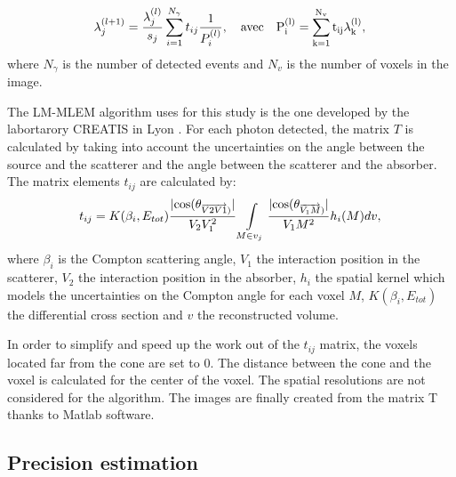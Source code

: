 \documentclass[11pt]{iopart}
\begin{document}
\begin{equation}
\lambda_j^{(l+1)} =  \frac{\lambda_j^{(l)} }{s_j} \sum\limits_{i=1}^{N_{\gamma}} t_{ij} \frac{1}{P_i^{(l)}},\quad \rm{avec}\quad  P_i^{(l)}=\sum\limits_{k=1}^{N_{v}} t_{ij}\lambda_k^{(l)},
 \label{eq:equation_lambda_compton_med_nucleaire}\newline
\end{equation}
where $N_{\gamma}$ is the number of detected events and $N_v$ is the number of voxels in the image.\newline

The LM-MLEM algorithm uses for this study is the one developed by the labortarory CREATIS in Lyon \cite{maxim_analytical_2009,lojacono_low_2013,maxim_filtered_2014,hilaire_compton_2014}.\newline
For each photon detected, the matrix $T$ is calculated by taking into account the uncertainties on the angle between the source and the scatterer and the angle between the scatterer and the absorber.
The matrix elements  $t_{ij}$  are calculated by:
\begin{equation}
 t_{ij} = K(\beta_i,E_{tot})\frac{|\rm{cos}(\theta_{\overrightarrow{V2V1})} |}{V_2V_1^2} \int\limits_{M\in v_j} \frac{|\rm{cos}(\theta_{\overrightarrow{V_1M})}| }{V_1M^2} h_i(M)dv,
 \label{eq:equation_tij_compton_med_nucleaire}\newline
\end{equation}
where $\beta_i$ is the Compton scattering angle, $V_1$ the interaction position in the scatterer, $V_2$ the interaction position in the absorber, $h_i$ the spatial kernel which models the uncertainties on the Compton angle for each voxel $M$, $K(\beta_i,E_{tot})$ the differential cross section and $v$ the reconstructed volume.\newline

In order to simplify and speed up the work out of the $t_{ij}$ matrix, the voxels located far from the cone are set to 0. The distance between the cone and the voxel is calculated for the center of the voxel. The spatial resolutions are not considered for the algorithm.\newline
The images are finally created from the matrix T thanks to Matlab software.

\subsection{Precision estimation}
\end{document}
